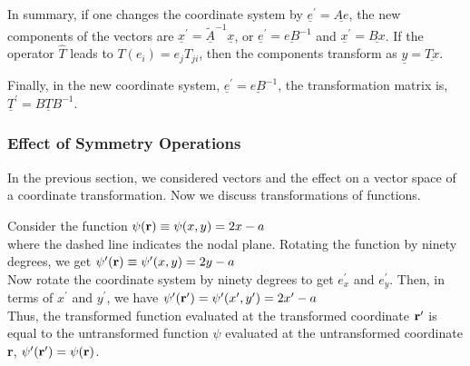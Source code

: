 In summary, if one changes the coordinate system by 
$\underline{e}^{\prime} = \underline{Ae}$, the new components of the 
vectors are $\underline{x}^{\prime} = \underline{\tilde{A}}^{-1} 
\underline{x}$, or $\underline{e}^{\prime} = \underline{eB}^{-1}$ 
and $\underline{x}^{\prime} = \underline{Bx}$.  If the operator 
${\hat{T}}$ leads to $T(e_i) = e_jT_{ji}$, then the components 
transform as $\underline{y} = \underline{Tx}$.

Finally, in the new coordinate system, $\underline{e}^{\prime} = 
\underline{eB}^{-1}$, the transformation matrix is, 
$\underline{T}^{\prime} = \underline{BTB}^{-1}$.

\subsubsection{Effect of Symmetry Operations}

In the previous section, we considered vectors and the effect on a 
vector space of a coordinate transformation.  Now we discuss 
transformations of functions.

Consider the function $\psi({\bf r}) \equiv \psi(x,y) = 2x-a$
\begin{equation}
\end{equation}
where the dashed line indicates the nodal plane.  Rotating the 
function by ninety degrees, we get $\psi^{\prime} ({\bf r}) \equiv 
\psi^{\prime}(x,y) = 2y-a$
\begin{equation}
\end{equation}
Now rotate the coordinate system by ninety degrees to get 
$e^{\prime}_x$ and $e^{\prime}_y$.  Then, in terms of $x^{\prime}$ 
and $y^{\prime}$, we have $\psi^{\prime} ( {\bf r}^{\prime}) = 
\psi^{\prime}(x^{\prime},y^{\prime}) = 2x^{\prime} -a$
\begin{equation}
\end{equation}
Thus, the transformed function evaluated at the transformed 
coordinate ${\bf r}^{\prime}$ is equal to the untransformed 
function $\psi$ evaluated at the untransformed coordinate {\bf r}, 
$\psi^{\prime}({\bf r}^{\prime})=\psi({\bf r})$.

